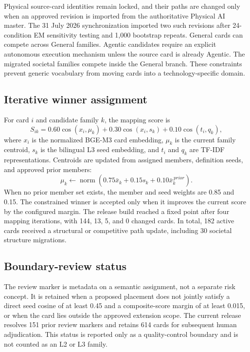 \documentclass[11pt,a4paper]{article}
\begin{document}
Physical source-card identities remain locked, and their paths are changed only
when an approved revision is imported from the authoritative Physical AI
master. The 31 July 2026 synchronization imported two such revisions after
24-condition EM sensitivity testing and 1,000 bootstrap repeats.
General cards can compete across General families. Agentic candidates require
an explicit autonomous execution mechanism unless the source card is already
Agentic. The migrated societal families compete inside the General branch.
These constraints prevent generic vocabulary from moving cards into a
technology-specific domain.

\subsection{Iterative winner assignment}

For card $i$ and candidate family $k$, the mapping score is
\begin{equation}
S_{ik}
=0.60\cos(x_i,\mu_k)
+0.30\cos(x_i,s_k)
+0.10\cos(t_i,q_k),
\end{equation}
where $x_i$ is the normalized BGE-M3 card embedding, $\mu_k$ is the current
family centroid, $s_k$ is the bilingual L3 seed embedding, and $t_i$ and $q_k$
are TF-IDF representations. Centroids are updated from assigned members,
definition seeds, and approved prior members:
\begin{equation}
\mu_k \leftarrow
\operatorname{norm}
\left(0.75\bar{x}_k+0.15s_k+0.10\bar{x}^{\,prior}_k\right).
\end{equation}
When no prior member set exists, the member and seed weights are 0.85 and 0.15.
The constrained winner is accepted only when it improves the current score by
the configured margin. The release build reached a fixed point after four
mapping iterations, with 144, 13, 5, and 0 changed cards. In total, 182 active
cards received a structural or competitive path update, including 30 societal
structure migrations.

\subsection{Boundary-review status}

The review marker is metadata on a semantic assignment, not a separate risk
concept. It is retained when a proposed placement does not jointly satisfy a
direct seed cosine of at least 0.45 and a composite-score margin of at least
0.015, or when the card lies outside the approved extension scope. The current
release resolves 151 prior review markers and retains 614 cards for subsequent
human adjudication. This status is reported only as a quality-control boundary
and is not counted as an L2 or L3 family.
\end{document}
